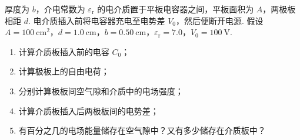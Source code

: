 \begin{exercise}\label{ex:16.10}
厚度为 $b$，介电常数为 $\varepsilon_{\mathrm{r}}$ 的电介质置于平板电容器之间，平板面积为 $A$，两极板相距 $d$. 电介质插入前将电容器充电至电势差 $V_0$，然后便断开电源. 假设 $A = 100 \ \mathrm{cm^2}$，$d = 1.0 \ \mathrm{cm}$，$b = 0.50 \ \mathrm{cm}$，$\varepsilon_{\mathrm{r}} = 7.0$，$V_0 = 100 \ \mathrm{V}$. 
\begin{enumerate}
  \item[(a)] 计算介质板插入前的电容 $C_0$；
  \item[(b)] 计算极板上的自由电荷；
  \item[(c)] 分别计算极板间空气隙和介质中的电场强度；
  \item[(d)] 计算介质板插入后两极板间的电势差；
  \item[(e)] 有百分之几的电场能量储存在空气隙中？又有多少储存在介质板中？
\end{enumerate}
\end{exercise}
